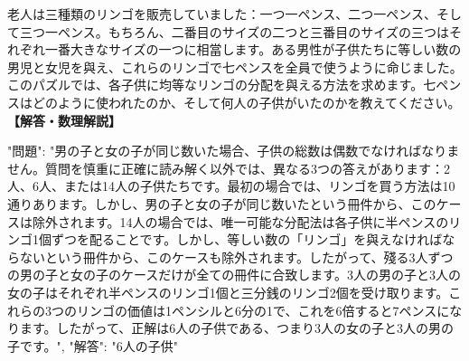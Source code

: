 \documentclass[10pt,a4paper,oneside,openany]{ltjsbook}
\begin{document}
\begin{tcolorbox}[colback=softblue,colframe=primaryblue,title=\textbf{第 36 問：BUYING APPLES.},arc=2mm,boxrule=1pt,breakable]
老人は三種類のリンゴを販売していました：一つ一ペンス、二つ一ペンス、そして三つ一ペンス。もちろん、二番目のサイズの二つと三番目のサイズの三つはそれぞれ一番大きなサイズの一つに相當します。ある男性が子供たちに等しい数の男児と女児を與え、これらのリンゴで七ペンスを全員で使うように命じました。このパズルでは、各子供に均等なリンゴの分配を與える方法を求めます。七ペンスはどのように使われたのか、そして何人の子供がいたのかを教えてください。
\tcblower
\textbf{【解答・数理解説】}\par\vspace{0.3em}
{
"問題": "男の子と女の子が同じ数いた場合、子供の総数は偶数でなければなりません。質問を慎重に正確に読み解く以外では、異なる3つの答えがあります：2人、6人、または14人の子供たちです。最初の場合では、リンゴを買う方法は10通りあります。しかし、男の子と女の子が同じ数いたという冊件から、このケースは除外されます。14人の場合では、唯一可能な分配法は各子供に半ペンスのリンゴ1個ずつを配ることです。しかし、等しい数の「リンゴ」を與えなければならないという冊件から、このケースも除外されます。したがって、殘る3人ずつの男の子と女の子のケースだけが全ての冊件に合致します。3人の男の子と3人の女の子はそれぞれ半ペンスのリンゴ1個と三分銭のリンゴ2個を受け取ります。これらの3つのリンゴの価値は1ペンシルと6分の1で、これを6倍すると7ペンスになります。したがって、正解は6人の子供である、つまり3人の女の子と3人の男の子です。",
"解答": "6人の子供"
}
\end{tcolorbox}
\end{document}
